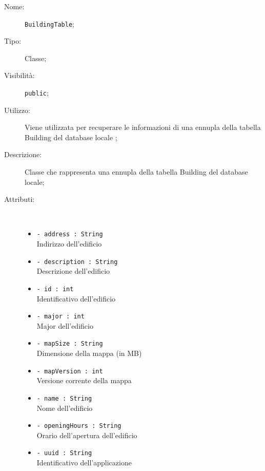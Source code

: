 \documentclass[../DefinizioneDiProdotto.tex]{subfiles}
\begin{document}
\begin{description}
	\item[Nome:] \texttt{BuildingTable};
	\item[Tipo:] Classe;
	\item[Visibilità:] \texttt{public};
	\item[Utilizzo:] Viene utilizzata per recuperare le informazioni di una ennupla della tabella Building del database locale ;
	\item[Descrizione:] Classe che rappresenta una ennupla della tabella Building del database locale;
	\item[Attributi:] \
	\begin{itemize}
		\item \texttt{- address : String}\\
		Indirizzo dell'edificio
		
		\item \texttt{- description : String}\\
		Descrizione dell'edificio
		
		\item \texttt{- id : int}\\
		Identificativo dell'edificio
		
		\item \texttt{- major : int}\\
		Major dell'edificio
		
		\item \texttt{- mapSize : String}\\
		Dimensione della mappa (in MB)
		
		\item \texttt{- mapVersion : int}\\
		Versione corrente della mappa
		
		\item \texttt{- name : String}\\
		Nome dell'edificio
		
		\item \texttt{- openingHours : String}\\
		Orario dell'apertura dell'edificio
		
		\item \texttt{- uuid : String}\\
		Identificativo dell'applicazione
		

\end{itemize}
\end{description}
\end{document}
